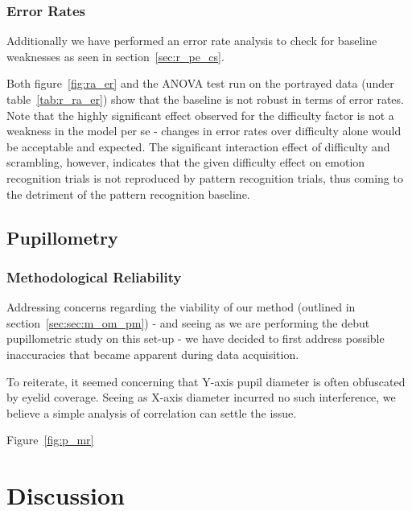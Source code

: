 	\subsection{Error Rates}\label{sec:r_ra_er}
	    Additionally we have performed an error rate analysis to check for baseline weaknesses as seen in section~\ref{sec:r_pe_cs}.
	    
	    Both figure~\ref{fig:ra_er} and the ANOVA test run on the portrayed data (under table~\ref{tab:r_ra_er}) show that the baseline is not robust in terms of error rates.
	    Note that the highly significant effect observed for the difficulty factor is not a weakness in the model per se - changes in error rates over difficulty alone would be acceptable and expected.
	    The significant interaction effect of difficulty and scrambling, however, indicates that the given difficulty effect on emotion recognition trials is not reproduced by pattern recognition trials, thus coming to the detriment of the pattern recognition baseline.	    
    
    \section{Pupillometry}\label{sec:r_p}
	\subsection{Methodological Reliability}\label{sec:r_p_mr}
	    Addressing concerns regarding the viability of our method (outlined in section~\ref{sec:sec:m_om_pm}) -
	    and seeing as we are performing the debut pupillometric study on this set-up -
	    we have decided to first address possible inaccuracies that became apparent during data acquisition.
	    
	    To reiterate, it seemed concerning that Y-axis pupil diameter is often obfuscated by eyelid coverage.
	    Seeing as X-axis diameter incurred no such interference, we believe a simple analysis of correlation can settle the issue.

	
	Figure~\ref{fig:p_mr}
\chapter{Discussion}
